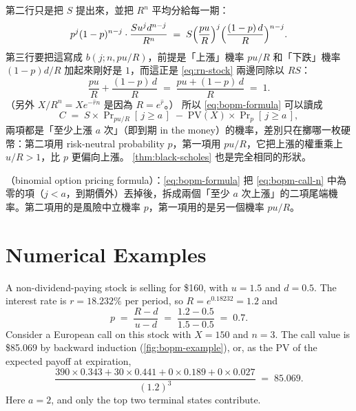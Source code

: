 \suppstart
\begin{note}
	第二行只是把 $S$ 提出來，並把 $R^{n}$ 平均分給每一期：
	\[
		p^{j}(1-p)^{n-j}\cdot\frac{Su^{j}d^{n-j}}{R^{n}} \;=\; S\Bigl(\frac{pu}{R}\Bigr)^{j}\Bigl(\frac{(1-p)\,d}{R}\Bigr)^{n-j} .
	\]
	第三行要把這寫成 $b(j;n,pu/R)$，前提是「上漲」機率 $pu/R$ 和「下跌」機率 $(1-p)d/R$ 加起來剛好是 $1$，而這正是 \eqref{eq:rn-stock} 兩邊同除以 $RS$：
	\[
		\frac{pu}{R}+\frac{(1-p)\,d}{R} \;=\; \frac{pu+(1-p)\,d}{R} \;=\; 1 .
	\]
	（另外 $X/R^{n}=Xe^{-\hat{r}n}$ 是因為 $R=e^{\hat{r}}$。）
	所以 \eqref{eq:bopm-formula} 可以讀成
	\[
		C \;=\; S\times\Pr\nolimits_{pu/R}[\,j\ge a\,] \;-\; \mathrm{PV}(X)\times\Pr\nolimits_{p}[\,j\ge a\,] ,
	\]
	兩項都是「至少上漲 $a$ 次」（即到期 in the money）的機率，差別只在擲哪一枚硬幣：第二項用 risk-neutral probability $p$，第一項用 $pu/R$，它把上漲的權重乘上 $u/R>1$，比 $p$ 更偏向上漲。
	\autoref{thm:black-scholes} 也是完全相同的形狀。
\end{note}

\begin{remark}
	（binomial option pricing formula）：\eqref{eq:bopm-formula} 把 \eqref{eq:bopm-call-n} 中為零的項（$j<a$，到期價外）丟掉後，拆成兩個「至少 $a$ 次上漲」的二項尾端機率。第二項用的是風險中立機率 $p$，第一項用的是另一個機率 $pu/R$。
\end{remark}
\suppend

\section{Numerical Examples}
\label{sec:bopm-numerical}


\begin{eg}
	\label{eg:bopm-three-period}
	A non-dividend-paying stock is selling for \$160, with $u=1.5$ and $d=0.5$.
	The interest rate is $r=18.232\%$ per period, so $R=e^{0.18232}=1.2$ and
	\[
		p \;=\; \frac{R-d}{u-d} \;=\; \frac{1.2-0.5}{1.5-0.5} \;=\; 0.7 .
	\]
	Consider a European call on this stock with $X=150$ and $n=3$.
	The call value is \$85.069 by backward induction (\autoref{fig:bopm-example}), or, as the PV of the expected payoff at expiration,
	\[
		\frac{390\times0.343+30\times0.441+0\times0.189+0\times0.027}{(1.2)^{3}} \;=\; 85.069 .
	\]
	\suppstart
	Here $a=2$, and only the top two terminal states contribute.
	\suppend
\end{eg}

